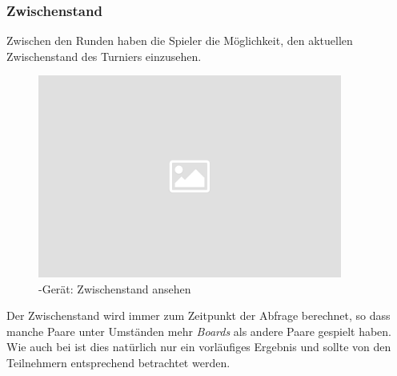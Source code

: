 \subsubsection{Zwischenstand}

\noindent
Zwischen den Runden haben die Spieler die Möglichkeit, den aktuellen Zwischenstand des Turniers einzusehen.\\[.1cm]

\noindent
\begin{figure}[ht]
	\centering
  \includegraphics[width=10cm]{pictures/placeholder.png}
	\caption{\cli-Gerät: Zwischenstand ansehen}
	\label{pic/cli_4_curres}
\end{figure}

\noindent
Der Zwischenstand wird immer zum Zeitpunkt der Abfrage berechnet, so dass manche Paare unter Umständen mehr \textit{Boards} als andere Paare gespielt haben. Wie auch bei \bbm ist dies natürlich nur ein vorläufiges Ergebnis und sollte von den Teilnehmern entsprechend betrachtet werden.
